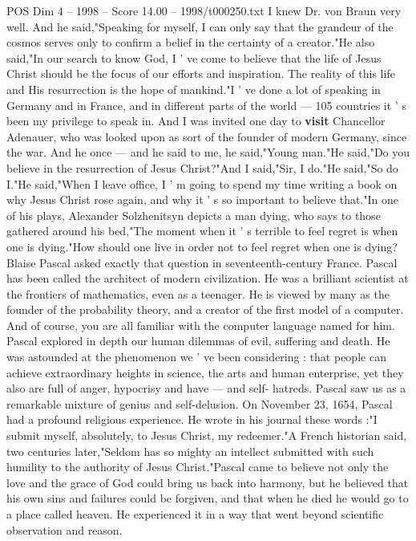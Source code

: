 \begin{textsample}{POS Dim 4 – 1998 – Score 14.00 – 1998/t000250.txt}
I knew Dr. von Braun very well.
And he said,"Speaking for myself, I can only say that the grandeur of the cosmos serves only to confirm a belief in the certainty of a creator."He also said,"In our search to know God, I ' ve come to believe that the life of Jesus Christ should be the focus of our efforts and inspiration.
The reality of this life and His resurrection is the hope of mankind."I ' ve done a lot of speaking in Germany and in France, and in different parts of the world — 105 countries it ' s been my privilege to speak in.
And I was invited one day to \textbf{visit} Chancellor Adenauer, who was looked upon as sort of the founder of modern Germany, since the war.
And he once — and he said to me, he said,"Young man."He said,"Do you believe in the resurrection of Jesus Christ?"And I said,"Sir, I do."He said,"So do I."He said,"When I leave office, I ' m going to spend my time writing a book on why Jesus Christ rose again, and why it ' s so important to believe that."In one of his plays, Alexander Solzhenitsyn depicts a man dying, who says to those gathered around his bed,"The moment when it ' s terrible to feel regret is when one is dying."How should one live in order not to feel regret when one is dying?
Blaise Pascal asked exactly that question in seventeenth-century France.
Pascal has been called the architect of modern civilization.
He was a brilliant scientist at the frontiers of mathematics, even as a teenager.
He is viewed by many as the founder of the probability theory, and a creator of the first model of a computer.
And of course, you are all familiar with the computer language named for him.
Pascal explored in depth our human dilemmas of evil, suffering and death.
He was astounded at the phenomenon we ' ve been considering : that people can achieve extraordinary heights in science, the arts and human enterprise, yet they also are full of anger, hypocrisy and have — and self- hatreds.
Pascal saw us as a remarkable mixture of genius and self-delusion.
On November 23, 1654, Pascal had a profound religious experience.
He wrote in his journal these words :"I submit myself, absolutely, to Jesus Christ, my redeemer."A French historian said, two centuries later,"Seldom has so mighty an intellect submitted with such humility to the authority of Jesus Christ."Pascal came to believe not only the love and the grace of God could bring us back into harmony, but he believed that his own sins and failures could be forgiven, and that when he died he would go to a place called heaven.
He experienced it in a way that went beyond scientific observation and reason.

\end{textsample}
